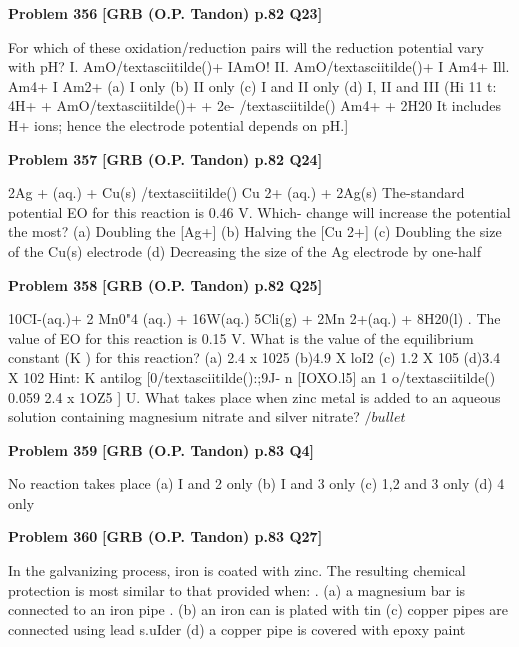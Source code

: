 \begin{problembox}
\textbf{Problem 356} \hfill \textbf{[GRB (O.P. Tandon) p.82 Q23]}
\label{q:ext-grb_all_questions-356}

For which of these oxidation/reduction pairs will the reduction 
potential vary with pH? 
I. AmO/textasciitilde()+ IAmO! 
II. AmO/textasciitilde()+ I Am4+ 
Ill. Am4+ I Am2+ 
(a) I only 
(b) II only 
(c) I and II only 
(d) I, II and III 
(Hi 11 t: 
4H+ + AmO/textasciitilde()+ + 2e- /textasciitilde() 
Am4+ + 2H20 
It includes H+ ions; hence the electrode potential depends on pH.]
\end{problembox}

\begin{problembox}
\textbf{Problem 357} \hfill \textbf{[GRB (O.P. Tandon) p.82 Q24]}
\label{q:ext-grb_all_questions-357}

2Ag + (aq.) + Cu(s) /textasciitilde() 
Cu 2+ (aq.) + 2Ag(s) 
The-standard potential EO for this reaction is 0.46 V. Which-
change will increase the potential the most? 
(a) Doubling the [Ag+] 
(b) Halving the [Cu 2+] 
(c) Doubling the size of the Cu(s) electrode 
(d) Decreasing the size of the Ag electrode by one-half
\end{problembox}

\begin{problembox}
\textbf{Problem 358} \hfill \textbf{[GRB (O.P. Tandon) p.82 Q25]}
\label{q:ext-grb_all_questions-358}

10CI-(aq.)+ 2 Mn0"4 (aq.) + 16W(aq.) 
5Cli(g) 
+ 2Mn 2+(aq.) + 8H20(l) 
. The value of EO for this reaction is 0.15 V. What is the value of 
the equilibrium constant (K ) for this reaction? 
(a) 2.4 x 1025 (b)4.9 X loI2 (c) 1.2 X 105 
(d)3.4 X 102 
Hint: 
K 
antilog [0/textasciitilde():;9J-
n 
[IOXO.l5] 
an 1 o/textasciitilde() 
0.059 
2.4 x 1OZ5 ] 
U. What takes place when zinc metal is added to an aqueous 
solution containing magnesium nitrate and silver nitrate? 
$/bullet$
\end{problembox}

\begin{problembox}
\textbf{Problem 359} \hfill \textbf{[GRB (O.P. Tandon) p.83 Q4]}
\label{q:ext-grb_all_questions-359}

No reaction takes place 
(a) I and 2 only 
(b) I and 3 only 
(c) 1,2 and 3 only 
(d) 4 only
\end{problembox}

\begin{problembox}
\textbf{Problem 360} \hfill \textbf{[GRB (O.P. Tandon) p.83 Q27]}
\label{q:ext-grb_all_questions-360}

In the galvanizing process, iron is coated with zinc. The 
resulting chemical protection is most similar to that provided 
when: 
. 
(a) a magnesium bar is connected to an iron pipe 
. (b) an iron can is plated with tin 
(c) copper pipes are connected using lead s.uIder 
(d) a copper pipe is covered with epoxy paint
\end{problembox}


